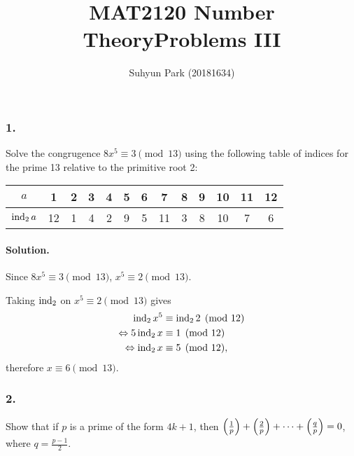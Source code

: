 



\title{MAT2120 Number Theory\newline\space Problems III}
\author{Suhyun Park (20181634)}

\maketitle

\subsubsection{1.} Solve the congrugence $8x^5 \equiv 3 \pmod{13}$ using the following
table of indices for the prime 13 relative to the primitive root 2:
\begin{center}
    \begin{tabular}{|c||c|c|c|c|c|c|c|c|c|c|c|c|}
        \hline
        $a$ & 1 & 2 & 3 & 4 & 5 & 6 & 7 & 8 & 9 & 10 & 11 & 12 \\
        \hline
        $\operatorname{\mathrm{ind}}_2 a$ & 12 & 1 & 4 & 2 & 9 & 5 & 11 & 3 & 8 & 10 & 7 & 6 \\
        \hline
    \end{tabular}
\end{center}

\paragraph{Solution.}
Since $8x^5 \equiv 3 \pmod{13}$, $x^5 \equiv 2 \pmod{13}$.

Taking $\operatorname{\mathrm{ind}}_2$ on $x^5 \equiv 2 \pmod{13}$ gives
\begin{align*}
    \operatorname{\mathrm{ind}}_2 x^5 &\equiv \operatorname{\mathrm{ind}}_2 2 \pmod{12} \\
    \Leftrightarrow 5 \operatorname{\mathrm{ind}}_2 x &\equiv 1 \pmod{12} \\
    \Leftrightarrow \operatorname{\mathrm{ind}}_2 x &\equiv 5 \pmod{12},
\end{align*}
therefore $x \equiv 6 \pmod{13}$.

\subsubsection{2.} Show that if $p$ is a prime of the form $4k+1$, then
$\left(\frac{1}{p}\right) + \left(\frac{2}{p}\right) + \cdots + \left(\frac{q}{p}\right)=0$, where
$q=\frac{p-1}{2}$.

